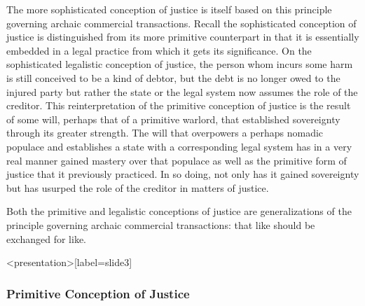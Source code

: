 The more sophisticated conception of justice is itself based on this principle governing archaic commercial transactions. Recall the sophisticated conception of justice is distinguished from its more primitive counterpart in that it is essentially embedded in a legal practice from which it gets its significance. On the sophisticated legalistic conception of justice, the person whom incurs some harm is still conceived to be a kind of debtor, but the debt is no longer owed to the injured party but rather the state or the legal system now assumes the role of the creditor. This reinterpretation of the primitive conception of justice is the result of some will, perhaps that of a primitive warlord, that established sovereignty through its greater strength. The will that overpowers a perhaps nomadic populace and establishes a state with a corresponding legal system has in a very real manner gained mastery over that populace as well as the primitive form of justice that it previously practiced. In so doing, not only has it gained sovereignty but has usurped the role of the creditor in matters of justice.

Both the primitive and legalistic conceptions of justice are generalizations of the principle governing archaic commercial transactions: that like should be exchanged for like. \change

\begin{frame}<presentation>[label=slide3]
    \frametitle{Primitive Conception of Justice}
\end{frame}

